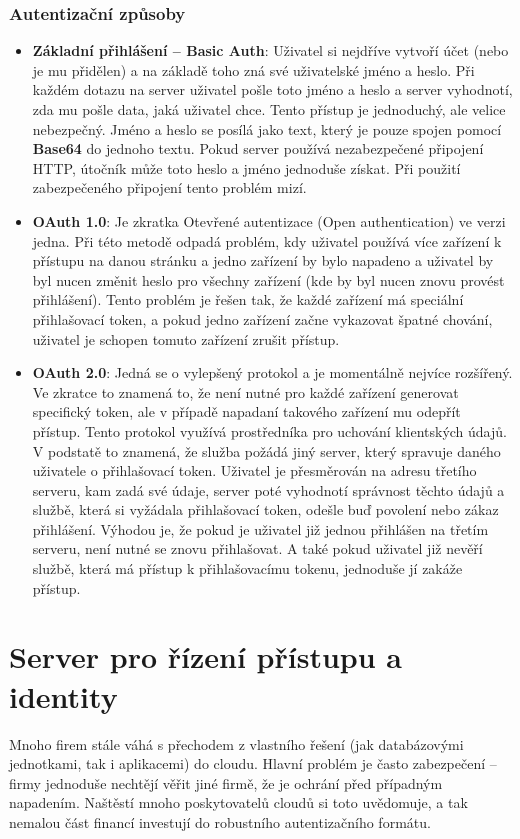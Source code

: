 \subsubsection{Autentizační způsoby}
\begin{itemize}
\item \textbf{Základní přihlášení -- Basic Auth}: Uživatel si nejdříve vytvoří účet (nebo je mu přidělen) a na základě toho zná své uživatelské jméno a heslo. Při každém dotazu na server uživatel pošle toto jméno a heslo a server vyhodnotí, zda mu pošle data, jaká uživatel chce. Tento přístup je jednoduchý, ale velice nebezpečný. Jméno a heslo se posílá jako text, který je pouze spojen pomocí \textbf{Base64} do jednoho textu. Pokud server používá nezabezpečené připojení HTTP, útočník může toto heslo a jméno jednoduše získat. Při použití zabezpečeného připojení tento problém mizí. \cite{rest-cookbook}
\item \textbf{OAuth 1.0}: Je zkratka Otevřené autentizace (Open authentication) ve verzi jedna. Při této metodě odpadá problém, kdy uživatel používá více zařízení k přístupu na danou stránku a jedno zařízení by bylo napadeno a uživatel by byl nucen změnit heslo pro všechny zařízení (kde by byl nucen znovu provést přihlášení). Tento problém je řešen tak, že každé zařízení má speciální přihlašovací token, a pokud jedno zařízení začne vykazovat špatné chování, uživatel je schopen tomuto zařízení zrušit přístup. \cite{rest-cookbook}
\item \textbf{OAuth 2.0}: Jedná se o vylepšený protokol a je momentálně nejvíce rozšířený. Ve zkratce to znamená to, že není nutné pro každé zařízení generovat specifický token, ale v případě napadaní takového zařízení mu odepřít přístup. Tento protokol využívá prostředníka pro uchování klientských údajů. V podstatě to znamená, že služba požádá jiný server, který spravuje daného uživatele o přihlašovací token. Uživatel je přesměrován na adresu třetího serveru, kam zadá své údaje, server poté vyhodnotí správnost těchto údajů a službě, která si vyžádala přihlašovací token, odešle buď povolení nebo zákaz přihlášení. Výhodou je, že pokud je uživatel již jednou přihlášen na třetím serveru, není nutné se znovu přihlašovat. A také pokud uživatel již nevěří službě, která má přístup k přihlašovacímu tokenu, jednoduše jí zakáže přístup. \cite{rest-cookbook}
\end{itemize}

\section{Server pro řízení přístupu a identity}
\par Mnoho firem stále váhá s přechodem z vlastního řešení (jak databázovými jednotkami, tak i aplikacemi) do cloudu. Hlavní problém je často zabezpečení -- firmy jednoduše nechtějí věřit jiné firmě, že je ochrání před případným napadením. Naštěstí mnoho poskytovatelů cloudů si toto uvědomuje, a tak nemalou část financí investují do robustního autentizačního formátu. \cite{cloud-security}

